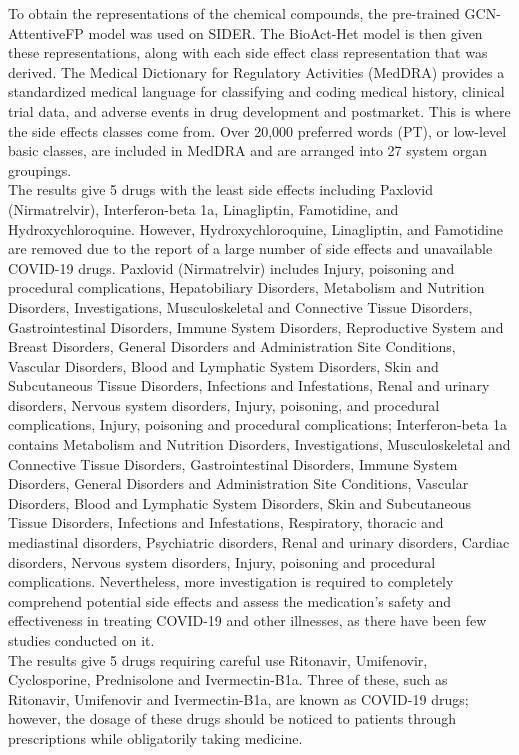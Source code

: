 \documentclass[conference]{IEEEtran}
\begin{document}
To obtain the representations of the chemical compounds, the pre-trained GCN-AttentiveFP model was used on SIDER. The BioAct-Het model is then given these representations, along with each side effect class representation that was derived. The Medical Dictionary for Regulatory Activities (MedDRA) provides a standardized medical language for classifying and coding medical history, clinical trial data, and adverse events in drug development and postmarket. This is where the side effects classes come from. Over 20,000 preferred words (PT), or low-level basic classes, are included in MedDRA and are arranged into 27 system organ groupings.\\

The results give 5 drugs with the least side effects including Paxlovid (Nirmatrelvir), Interferon-beta 1a, Linagliptin, Famotidine, and Hydroxychloroquine. However, Hydroxychloroquine, Linagliptin, and Famotidine are removed due to the report of a large number of side effects and unavailable COVID-19 drugs. Paxlovid (Nirmatrelvir) includes Injury, poisoning and procedural complications, Hepatobiliary Disorders, Metabolism and Nutrition Disorders, Investigations, Musculoskeletal and Connective Tissue Disorders, Gastrointestinal Disorders, Immune System Disorders, Reproductive System and Breast Disorders, General Disorders and Administration Site Conditions, Vascular Disorders, Blood and Lymphatic System Disorders, Skin and Subcutaneous Tissue Disorders, Infections and Infestations, Renal and urinary disorders, Nervous system disorders, Injury, poisoning, and procedural complications, Injury, poisoning and procedural complications; Interferon-beta 1a contains Metabolism and Nutrition Disorders, Investigations, Musculoskeletal and Connective Tissue Disorders, Gastrointestinal Disorders, Immune System Disorders, General Disorders and Administration Site Conditions, Vascular Disorders, Blood and Lymphatic System Disorders, Skin and Subcutaneous Tissue Disorders, Infections and Infestations, Respiratory, thoracic and mediastinal disorders, Psychiatric disorders, Renal and urinary disorders, Cardiac disorders, Nervous system disorders, Injury, poisoning and procedural complications.  Nevertheless, more investigation is required to completely comprehend potential side effects and assess the medication's safety and effectiveness in treating COVID-19 and other illnesses, as there have been few studies conducted on it.\\

The results give 5 drugs requiring careful use Ritonavir, Umifenovir, Cyclosporine, Prednisolone and Ivermectin-B1a. Three of these, such as Ritonavir, Umifenovir and Ivermectin-B1a, are known as COVID-19 drugs; however, the dosage of these drugs should be noticed to patients through prescriptions while obligatorily taking medicine.  \\
\end{document}
